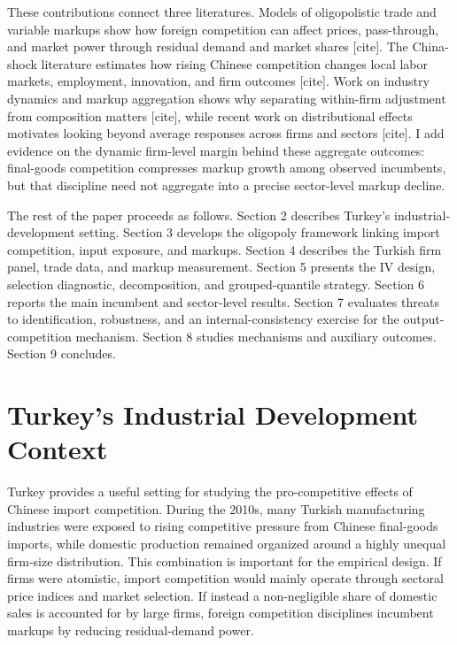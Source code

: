 \documentclass[12pt]{article}
\newcommand{\parencite}[2][]{[cite]}
\begin{document}
These contributions connect three literatures. Models of oligopolistic trade and variable markups show how foreign competition can affect prices, pass-through, and market power through residual demand and market shares \parencite{deblasUnderstandingMarkupsOpen2015,atkesonPricingtoMarketTradeCosts2008,amitiInternationalShocksVariable2019,bernardPlantsProductivityInternational2003,edmondCompetitionMarkupsGains2015}. The China-shock literature estimates how rising Chinese competition changes local labor markets, employment, innovation, and firm outcomes \parencite{autorChinaSyndromeLocal2013,autorTradeAdjustmentWorkerLevel2014,acemogluImportCompetitionGreat2016,pierceSurprisinglySwiftDecline2016,aghionOpposingFirmLevelResponses2024,bloomTradeInducedTechnical2016}. Work on industry dynamics and markup aggregation shows why separating within-firm adjustment from composition matters \parencite{melitzImpactTradeIntraIndustry2003,ericsonMarkovPerfectIndustryDynamics1995,hopenhaynEntryExitFirm1992,bursteinBottomUpMarkupFluctuations2025,baqaeeProductivityMisallocationGeneral2020}, while recent work on distributional effects motivates looking beyond average responses across firms and sectors \parencite{chetverikovIVQuantileRegression2016,galleSlicingPieQuantifying2023}. I add evidence on the dynamic firm-level margin behind these aggregate outcomes: final-goods competition compresses markup growth among observed incumbents, but that discipline need not aggregate into a precise sector-level markup decline.

The rest of the paper proceeds as follows. Section 2 describes Turkey's industrial-development setting. Section 3 develops the oligopoly framework linking import competition, input exposure, and markups. Section 4 describes the Turkish firm panel, trade data, and markup measurement. Section 5 presents the IV design, selection diagnostic, decomposition, and grouped-quantile strategy. Section 6 reports the main incumbent and sector-level results. Section 7 evaluates threats to identification, robustness, and an internal-consistency exercise for the output-competition mechanism. Section 8 studies mechanisms and auxiliary outcomes. Section 9 concludes.


\section{Turkey's Industrial Development Context}

\label{sec:turkey_context}

Turkey provides a useful setting for studying the pro-competitive effects of Chinese import competition. 
During the 2010s, many Turkish manufacturing industries were exposed to rising competitive pressure from Chinese final-goods imports, while domestic production remained organized around a highly unequal firm-size distribution. 
This combination is important for the empirical design. If firms were atomistic, import competition would mainly operate through sectoral price indices and market selection. 
If instead a non-negligible share of domestic sales is accounted for by large firms, foreign competition disciplines incumbent markups by reducing residual-demand power.
\end{document}

